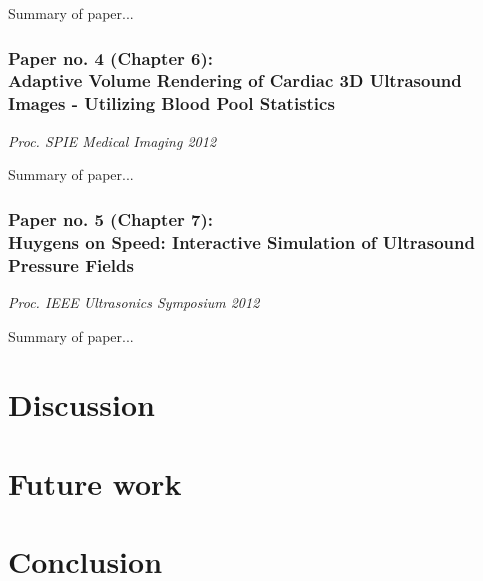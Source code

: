 Summary of paper...

\subsubsection{Paper no. 4 (Chapter 6):\\
Adaptive Volume Rendering of Cardiac 3D Ultrasound Images - Utilizing Blood Pool Statistics}

{\it Proc. SPIE Medical Imaging 2012}
\vspace{0.3 cm}

Summary of paper...

\subsubsection{Paper no. 5 (Chapter 7):\\
Huygens on Speed: Interactive Simulation of Ultrasound Pressure Fields}

{\it Proc. IEEE Ultrasonics Symposium 2012}
\vspace{0.3 cm}

Summary of paper...

\section{Discussion}

\section{Future work}

\section{Conclusion}

\endinput